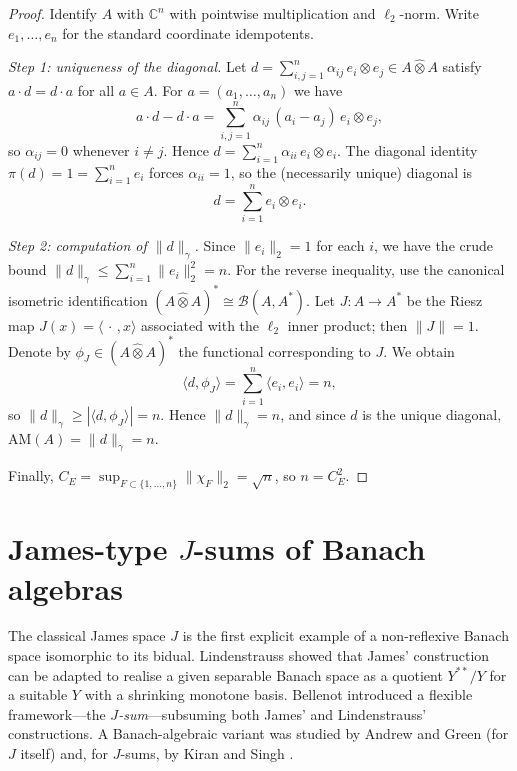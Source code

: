 \documentclass[reqno]{amsart}
\theoremstyle{plain}
\theoremstyle{definition}
\theoremstyle{remark}
\newcommand{\AM}{\mathrm{AM}}
\renewcommand{\le}{\leqslant}
\renewcommand{\ge}{\geqslant}
\begin{document}
\begin{proof}
Identify $A$ with $\mathbb C^n$ with pointwise multiplication and $\ell_2$-norm.
Write $e_1,\dots,e_n$ for the standard coordinate idempotents.

\smallskip
\noindent\emph{Step 1: uniqueness of the diagonal.}
Let $d=\sum_{i,j=1}^n \alpha_{ij}\, e_i\otimes e_j \in A\hat\otimes A$
satisfy $a\cdot d=d\cdot a$ for all $a\in A$.
For $a=(a_1,\dots,a_n)$ we have
\[
a\cdot d - d\cdot a
= \sum_{i,j=1}^n \alpha_{ij}\,(a_i-a_j)\,e_i\otimes e_j,
\]
so $\alpha_{ij}=0$ whenever $i\neq j$. Hence $d=\sum_{i=1}^n \alpha_{ii}\,e_i\otimes e_i$.
The diagonal identity $\pi(d)=1=\sum_{i=1}^n e_i$ forces $\alpha_{ii}=1$,
so the (necessarily unique) diagonal is
\[
d=\sum_{i=1}^n e_i\otimes e_i.
\]

\smallskip
\noindent\emph{Step 2: computation of $\|d\|_\gamma$.}
Since $\|e_i\|_2=1$ for each $i$, we have the crude bound
\(
\|d\|_\gamma \le \sum_{i=1}^n \|e_i\|_2^2 = n.
\)
For the reverse inequality, use the canonical isometric identification
$(A\hat\otimes A)^*\cong \mathcal B(A,A^*)$.
Let $J:A\to A^*$ be the Riesz map $J(x)=\langle \,\cdot\,,x\rangle$ associated
with the $\ell_2$ inner product; then $\|J\|=1$.
Denote by $\phi_J\in (A\hat\otimes A)^*$ the functional corresponding to $J$.
We obtain
\[
\langle d,\phi_J\rangle
= \sum_{i=1}^n \langle e_i,e_i\rangle
= n,
\]
so $\|d\|_\gamma \ge |\langle d,\phi_J\rangle| = n$.
Hence $\|d\|_\gamma=n$, and since $d$ is the unique diagonal, $\AM(A)=\|d\|_\gamma=n$.

Finally, $C_E=\sup_{F\subset\{1,\dots,n\}}\|\chi_F\|_2=\sqrt{n}$, so $n=C_E^2$.
\end{proof}


\section{James-type $J$-sums of Banach algebras}\label{sec:Jsums}

The classical James space $J$ \cite{James1960} is the first explicit example of a
non-reflexive Banach space isomorphic to its bidual.
Lindenstrauss \cite{Lindenstrauss1971} showed that James' construction can be
adapted to realise a given separable Banach space as a quotient $Y^{**}/Y$ for a
suitable $Y$ with a shrinking monotone basis.  Bellenot \cite{Bellenot1982}
introduced a flexible framework---the \emph{$J$-sum}---subsuming both James' and
Lindenstrauss' constructions.  A Banach-algebraic variant was studied by Andrew
and Green \cite{AndrewGreen1980} (for $J$ itself) and, for $J$-sums, by Kiran and
Singh \cite{KiranSingh1988}.
\end{document}
